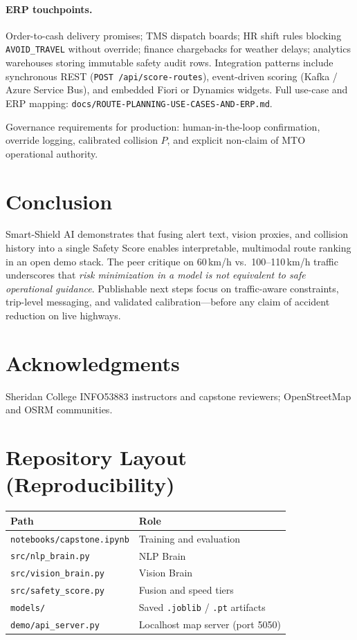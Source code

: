 \documentclass[11pt,a4paper]{article}
\begin{document}
\paragraph{ERP touchpoints.}
Order-to-cash delivery promises; TMS dispatch boards; HR shift rules blocking \texttt{AVOID\_TRAVEL} without override; finance chargebacks for weather delays; analytics warehouses storing immutable safety audit rows. Integration patterns include synchronous REST (\texttt{POST /api/score-routes}), event-driven scoring (Kafka / Azure Service Bus), and embedded Fiori or Dynamics widgets. Full use-case and ERP mapping: \texttt{docs/ROUTE-PLANNING-USE-CASES-AND-ERP.md}.

Governance requirements for production: human-in-the-loop confirmation, override logging, calibrated collision $P$, and explicit non-claim of MTO operational authority.

\section{Conclusion}
\label{sec:conclusion}

Smart-Shield AI demonstrates that fusing alert text, vision proxies, and collision history into a single Safety Score enables interpretable, multimodal route ranking in an open demo stack. The peer critique on 60\,km/h vs.\ 100--110\,km/h traffic underscores that \emph{risk minimization in a model is not equivalent to safe operational guidance}. Publishable next steps focus on traffic-aware constraints, trip-level messaging, and validated calibration---before any claim of accident reduction on live highways.

\section*{Acknowledgments}
Sheridan College INFO53883 instructors and capstone reviewers; OpenStreetMap and OSRM communities.




\appendix
\section{Repository Layout (Reproducibility)}
\label{app:repo}

\begin{tabular}{@{}ll@{}}
\toprule
Path & Role \\
\midrule
\texttt{notebooks/capstone.ipynb} & Training and evaluation \\
\texttt{src/nlp\_brain.py} & NLP Brain \\
\texttt{src/vision\_brain.py} & Vision Brain \\
\texttt{src/safety\_score.py} & Fusion and speed tiers \\
\texttt{models/} & Saved \texttt{.joblib} / \texttt{.pt} artifacts \\
\texttt{demo/api\_server.py} & Localhost map server (port 5050) \\
\bottomrule
\end{tabular}
\end{document}
